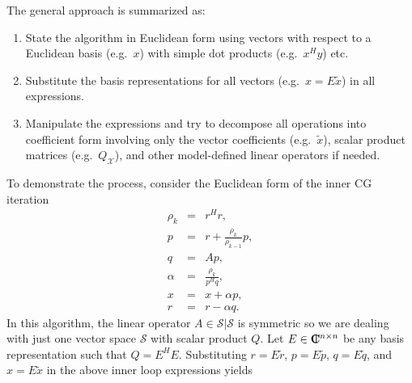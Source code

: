 The general approach is summarized as:
%
\begin{enumerate}
%
{}\item State the algorithm in Euclidean form using vectors with respect to a
Euclidean basis (e.g.\ $x$) with simple dot products (e.g.\ $x^H y$) etc.
%
{}\item Substitute the basis representations for all vectors (e.g.\ $x = E
{}\tilde{x}$) in all expressions.
%
{}\item Manipulate the expressions and try to decompose all operations into
coefficient form involving only the vector coefficients (e.g.\ $\tilde{x}$),
scalar product matrices (e.g.\ $Q_{\mathcal{X}}$), and other model-defined
linear operators if needed.
%
\end{enumerate}
%
To demonstrate the process, consider the Euclidean form of the inner CG
iteration
%
\begin{eqnarray*}
\rho_k & = & r^H r, \\
p & = & r + \frac{\rho_k}{\rho_{k-1}} p, \\
q & = & A p, \\
\alpha & = & \frac{\rho_k}{p^H q}, \\
x & = & x + \alpha p, \\
r & = & r - \alpha q.
\end{eqnarray*}
%
In this algorithm, the linear operator $A\in\mathcal{S}|\mathcal{S}$ is
symmetric so we are dealing with just one vector space $\mathcal{S}$ with
scalar product $Q$.  Let $E\in\mbox{\textbf{C}}\hspace{-1.1ex}\mbox{l}\hspace{0.4ex}^{n\times{}n}$ be any basis representation
such that $Q=E^H E$.  Substituting $r=E\tilde{r}$, $p=E\tilde{p}$,
$q=E\tilde{q}$, and $x=E\tilde{x}$ in the above inner loop expressions yields
%
